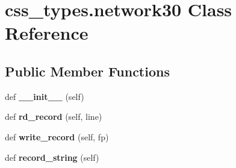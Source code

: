 \hypertarget{classcss__types_1_1network30}{}\section{css\+\_\+types.\+network30 Class Reference}
\label{classcss__types_1_1network30}
\subsection*{Public Member Functions}
\begin{DoxyCompactItemize}
\item 
\hypertarget{classcss__types_1_1network30_ac4ee1f3e93d975eca8f0bc1aa6d6b75b}{}def {\bfseries \+\_\+\+\_\+init\+\_\+\+\_\+} (self)\label{classcss__types_1_1network30_ac4ee1f3e93d975eca8f0bc1aa6d6b75b}

\item 
\hypertarget{classcss__types_1_1network30_a7988b50143d0d07566515820ae92b1fe}{}def {\bfseries rd\+\_\+record} (self, line)\label{classcss__types_1_1network30_a7988b50143d0d07566515820ae92b1fe}

\item 
\hypertarget{classcss__types_1_1network30_ad7640188f2888991a5b07c8af1be0a54}{}def {\bfseries write\+\_\+record} (self, fp)\label{classcss__types_1_1network30_ad7640188f2888991a5b07c8af1be0a54}

\item 
\hypertarget{classcss__types_1_1network30_abd707d906174b09c890f8fc90581a40e}{}def {\bfseries record\+\_\+string} (self)\label{classcss__types_1_1network30_abd707d906174b09c890f8fc90581a40e}

\end{DoxyCompactItemize}
